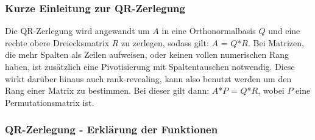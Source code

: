 \documentclass[a4paper,11pt]{article}
\theoremstyle{definition}
\begin{document}
\subsubsection{Kurze Einleitung zur QR-Zerlegung}

Die QR-Zerlegung wird angewandt um $A$ in eine Orthonormalbasis $Q$ und eine rechte
obere Dreiecksmatrix $R$ zu zerlegen, sodass gilt: $A$ = $Q$*$R$. Bei Matrizen, die
mehr Spalten als Zeilen aufweisen, oder keinen vollen numerischen Rang haben, ist
zusätzlich eine Pivotisierung mit Spaltentauschen notwendig. Diese wirkt darüber
hinaus auch rank-revealing, kann also benutzt werden um den Rang einer Matrix zu
bestimmen. Bei dieser gilt dann: $A$*$P$ = $Q$*$R$, wobei $P$ eine Permutationsmatrix ist.

\subsubsection{QR-Zerlegung - Erklärung der Funktionen}
\end{document}
